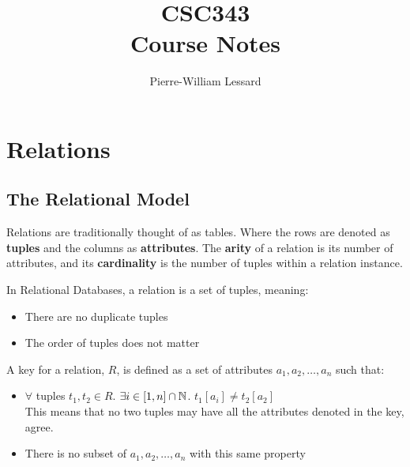 \documentclass{report}
\title{\Huge{CSC343}\\Course Notes}
\author{\huge{Pierre-William Lessard}}
\date{}
\begin{document}
    \maketitle
    \newpage
    \tableofcontents
    \pagebreak


    \chapter{Relations}
    \section{The Relational Model}

    \vspace{.5cm}

    \par Relations are traditionally thought of as tables. Where the rows are denoted as \textbf{tuples} and the columns as \textbf{attributes}. The \textbf{arity} of a relation is its number of attributes, and its \textbf{cardinality} is the number of tuples within a relation instance. \\
    
    \par In Relational Databases, a relation is a set of tuples, meaning: 
    \begin{itemize}
        \item There are no duplicate tuples
        \item The order of tuples does not matter
    \end{itemize} 
\vspace{.5cm}
 
    {
        A key for a relation, $R$, is defined as a set of attributes $a_1, a_2, \dots, a_n$ such that:
        \begin{itemize}
            \item $\forall$ tuples $t_1, t_2 \in R$. $\exists i \in [1,n]\cap \mathbb{N}$. $t_1 [a_i] \neq t_2 [a_2] $ \\
            This means that no two tuples may have all the attributes denoted in the key, agree. 

            \item There is no subset of $a_1, a_2, \dots, a_n$ with this same property
            
        \end{itemize}
    } \vspace{.5cm}
     
\end{document}
